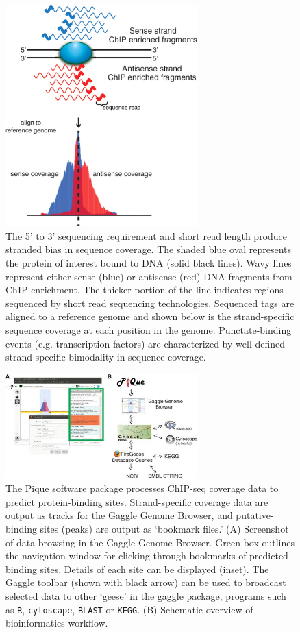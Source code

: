 \begin{figure}
\centering
\includegraphics[width=20em]{SaltyBugs/figures/fig2}
\caption{The 5' to 3' sequencing requirement and short read length produce stranded bias in sequence coverage. The shaded blue oval represents the protein of interest bound to DNA (solid black lines). Wavy lines represent either sense (blue) or antisense (red) DNA fragments from ChIP enrichment. The thicker portion of the line indicates regions sequenced by short read sequencing technologies. Sequenced tags are aligned to a reference genome and shown below is the strand-specific sequence coverage at each position in the genome. Punctate-binding events (e.g. transcription factors) are characterized by well-defined strand-specific bimodality in sequence coverage.}
\label{SB_fig2}
\end{figure}


\begin{figure}
\centering
\includegraphics[width=20em]{SaltyBugs/figures/fig3}
\caption{The Pique software package processes ChIP-seq coverage data to predict protein-binding sites. Strand-specific coverage data are output as tracks for the Gaggle Genome Browser, and putative-binding sites (peaks) are output as `bookmark files.' (A) Screenshot of data browsing in the Gaggle Genome Browser. Green box outlines the navigation window for clicking through bookmarks of predicted binding sites. Details of each site can be displayed (inset). The Gaggle toolbar (shown with black arrow) can be used to broadcast selected data to other `geese' in the gaggle package, programs such as {\tt R}, {\tt cytoscape}, {\tt BLAST} or {\tt KEGG}. (B) Schematic overview of bioinformatics workflow.}
\label{SB_fig3}
\end{figure}

